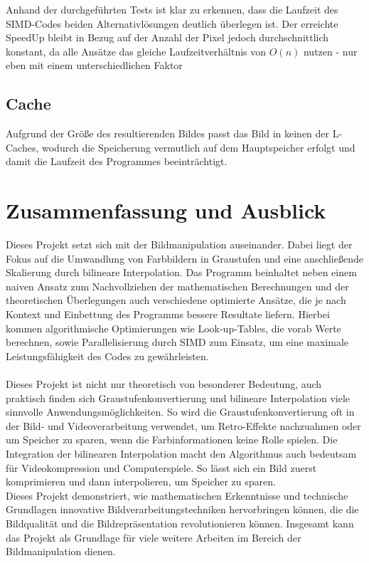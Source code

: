 \documentclass[course=erap]{aspdoc}
\begin{document}
\noindent
Anhand der durchgeführten Tests ist klar zu erkennen, dass die Laufzeit des SIMD-Codes beiden Alternativlösungen deutlich überlegen ist. Der erreichte SpeedUp bleibt in Bezug auf der Anzahl der Pixel jedoch durchschnittlich konstant, da alle Ansätze das gleiche Laufzeitverhältnis von $O(n)$ nutzen - nur eben mit einem unterschiedlichen Faktor

\subsection{Cache}
Aufgrund der Größe des resultierenden Bildes passt das Bild in keinen der L-Caches, wodurch die Speicherung vermutlich auf dem Hauptspeicher erfolgt und damit die Laufzeit des Programmes beeinträchtigt.

\section{Zusammenfassung und Ausblick}
Dieses Projekt setzt sich mit der Bildmanipulation auseinander. Dabei liegt der Fokus auf die Umwandlung von Farbbildern in Graustufen und eine anschließende Skalierung durch bilineare Interpolation. Das Programm beinhaltet neben einem naiven Ansatz zum Nachvollziehen der mathematischen Berechnungen und der theoretischen Überlegungen auch verschiedene optimierte Ansätze, die je nach Kontext und Einbettung des Programms bessere Resultate liefern. Hierbei kommen algorithmische Optimierungen wie Look-up-Tables, die vorab Werte berechnen, sowie Parallelisierung durch SIMD zum Einsatz, um eine maximale Leistungsfähigkeit des Codes zu gewährleisten.\\\\
Dieses Projekt ist nicht nur theoretisch von besonderer Bedeutung, auch praktisch finden sich Graustufenkonvertierung und bilineare Interpolation viele sinnvolle Anwendungsmöglichkeiten. So wird die Graustufenkonvertierung oft in der Bild- und Videoverarbeitung verwendet, um Retro-Effekte nachzuahmen oder um Speicher zu sparen, wenn die Farbinformationen keine Rolle spielen. Die Integration der bilinearen Interpolation macht den Algorithmus auch bedeutsam für Videokompression und Computerspiele. So lässt sich ein Bild zuerst komprimieren und dann interpolieren, um Speicher zu sparen.\\
Dieses Projekt demonstriert, wie mathematischen Erkenntnisse und technische Grundlagen innovative Bildverarbeitungstechniken hervorbringen können, die die Bildqualität und die Bildrepräsentation revolutionieren können. Insgesamt kann das Projekt als Grundlage für viele weitere Arbeiten im Bereich der Bildmanipulation dienen.


{

\cite{ece472}
\cite{ppm}
\cite{ppmformats}
\cite{pgmpgmpbm}
\cite{grafikgraustufen}
\cite{bilint}
\cite{wahrnehmung}

}
\end{document}
